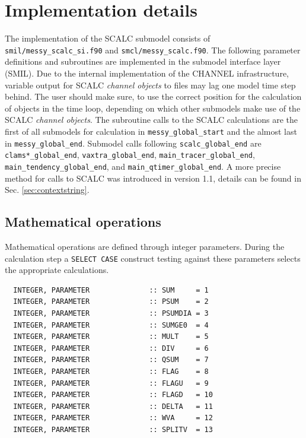 \documentclass[twoside]{article}
\begin{document}
\section{Implementation details}
%
The implementation of the SCALC submodel consists of {\tt smil/messy\_scalc\_si.f90} and {\tt smcl/messy\_scalc.f90}.
The following parameter definitions and subroutines are implemented in the submodel interface layer (SMIL).
Due to the internal implementation of the CHANNEL infrastructure, variable output for SCALC {\it channel objects} to files may lag one model time step behind.
The user should make sure, to use the correct position for the calculation of objects in the time loop, depending on which other submodels make use of the  SCALC {\it channel objects}.
The subroutine calls to the SCALC calculations are the first of all submodels for calculation in {\tt messy\_global\_start} and the almost last in {\tt messy\_global\_end}.
Submodel calls following {\tt scalc\_global\_end} are {\tt clams*\_global\_end}, {\tt vaxtra\_global\_end}, {\tt main\_tracer\_global\_end}, {\tt main\_tendency\_global\_end}, and {\tt main\_qtimer\_global\_end}.
A more precise method for calls to SCALC was introduced in version 1.1, details can be found in Sec. \ref{sec:contextstring}.
%
\subsection{Mathematical operations}
\label{sec:mathoperations}
%
Mathematical operations are defined through integer parameters.
During the calculation step a {\tt SELECT CASE} construct testing against these parameters selects the appropriate calculations.
%
\begin{verbatim}
  INTEGER, PARAMETER              :: SUM     = 1
  INTEGER, PARAMETER              :: PSUM    = 2
  INTEGER, PARAMETER              :: PSUMDIA = 3
  INTEGER, PARAMETER              :: SUMGE0  = 4
  INTEGER, PARAMETER              :: MULT    = 5
  INTEGER, PARAMETER              :: DIV     = 6
  INTEGER, PARAMETER              :: QSUM    = 7
  INTEGER, PARAMETER              :: FLAG    = 8
  INTEGER, PARAMETER              :: FLAGU   = 9
  INTEGER, PARAMETER              :: FLAGD   = 10
  INTEGER, PARAMETER              :: DELTA   = 11
  INTEGER, PARAMETER              :: WVA     = 12
  INTEGER, PARAMETER              :: SPLITV  = 13
\end{verbatim}
%
\end{document}
